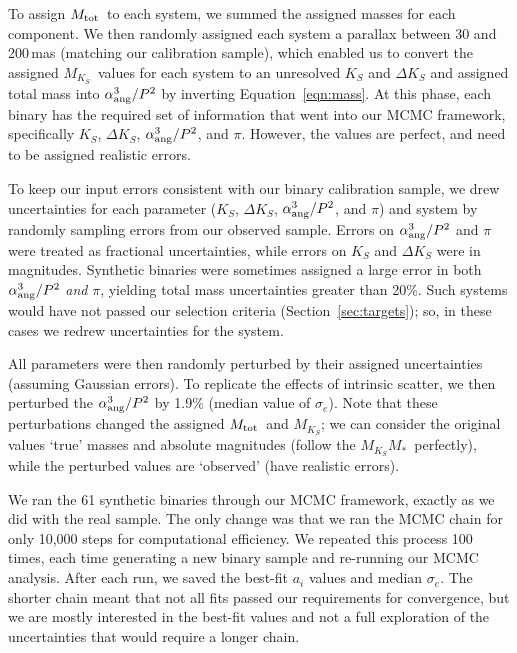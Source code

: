 \documentclass[twocolumn]{aastex62}
\newcommand{\mks}{$M_{K_S}$}
\newcommand{\mmk}{$M_{K_S}$\textendash$M_*$}
\newcommand{\mtot}{$M_{\rm{tot}}$}
\begin{document}
To assign \mtot\ to each system, we summed the assigned masses for each component. We then randomly assigned each system a parallax between 30 and 200\,mas (matching our calibration sample), which enabled us to convert the assigned \mks\ values for each system to an unresolved $K_S$ and $\Delta K_S$ and assigned total mass into $\alpha_{\rm{ang}}^3/P^2$ by inverting Equation~\ref{eqn:mass}. At this phase, each binary has the required set of information that went into our MCMC framework, specifically $K_S$, $\Delta K_S$, $\alpha_{\rm{ang}}^3/P^2$, and $\pi$. However, the values are perfect, and need to be assigned realistic errors. 

To keep our input errors consistent with our binary calibration sample, we drew uncertainties for each parameter ($K_S$, $\Delta K_S$, $\alpha_{\rm{ang}}^3/P^2$, and $\pi$) and system by randomly sampling errors from our observed sample. Errors on $\alpha_{\rm{ang}}^3/P^2$ and $\pi$ were treated as fractional uncertainties, while errors on $K_S$ and $\Delta K_S$ were in magnitudes. Synthetic binaries were sometimes assigned a large error in both $\alpha_{\rm{ang}}^3/P^2$ {\it and} $\pi$, yielding total mass uncertainties greater than 20\%. Such systems would have not passed our selection criteria (Section~\ref{sec:targets}); so, in these cases we redrew uncertainties for the system. 

All parameters were then randomly perturbed by their assigned uncertainties (assuming Gaussian errors). To replicate the effects of intrinsic scatter, we then perturbed the $\alpha_{\rm{ang}}^3/P^2$ by 1.9\% (median value of $\sigma_e$). Note that these perturbations changed the assigned \mtot\ and \mks; we can consider the original values `true' masses and absolute magnitudes (follow the \mmk\ perfectly), while the perturbed values are `observed' (have realistic errors). 

We ran the 61 synthetic binaries through our MCMC framework, exactly as we did with the real sample. The only change was that we ran the MCMC chain for only 10,000 steps for computational efficiency. We repeated this process 100 times, each time generating a new binary sample and re-running our MCMC analysis. After each run, we saved the best-fit $a_i$ values and median $\sigma_e$. The shorter chain meant that not all fits passed our requirements for convergence, but we are mostly interested in the best-fit values and not a full exploration of the uncertainties that would require a longer chain. 
\end{document}
